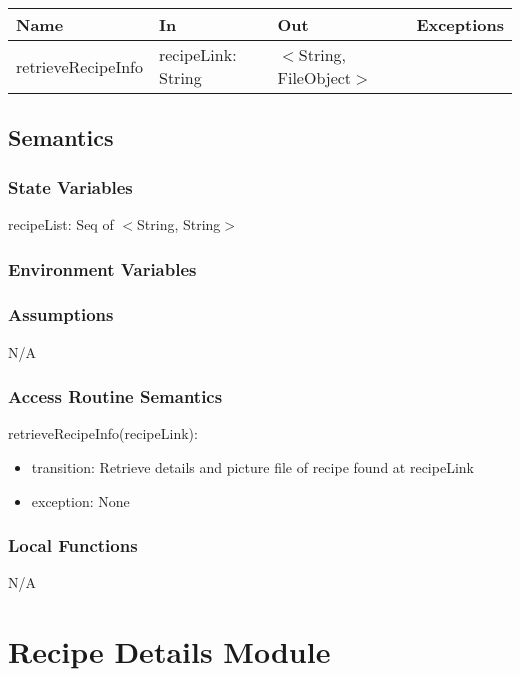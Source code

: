 \documentclass[12pt, titlepage]{article}
\begin{document}
\begin{tabular}{| l | l | l | l |}
	\hline
	{\textbf{Name}} & {\textbf{In}} & {\textbf{Out}} & {\textbf{Exceptions}}\\
	\hline
	{retrieveRecipeInfo} &recipeLink: String & $<$String, FileObject$>$ & \\
	\hline
\end{tabular}

\subsection{Semantics}

\subsubsection{State Variables}
recipeList: Seq of  $<$String, String$>$\\

\subsubsection{Environment Variables}

\subsubsection{Assumptions}

N/A

\subsubsection{Access Routine Semantics}

\noindent retrieveRecipeInfo(recipeLink):
\begin{itemize}
	\item transition: Retrieve details and picture file of recipe found at recipeLink
	\item exception: None
\end{itemize}

\subsubsection{Local Functions}

N/A

\section{Recipe Details Module} \label{Module} 
\end{document}
